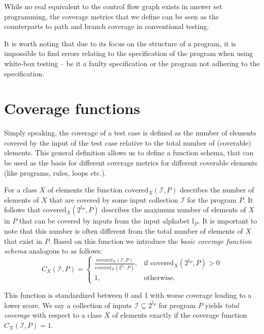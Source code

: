 While no real equivalent to the control flow graph exists in answer set programming, the coverage metrics that we define can be seen as the counterparts to path and branch coverage in conventional testing.

It is worth noting that due to its focus on the structure of a program, it is impossible to find errors relating to the specification of the program when using white-box testing -- be it a faulty specification or the program not adhering to the specification.


\section{Coverage functions}
\label{sec:Coverage metrics/Coverage functions}
Simply speaking, the coverage of a test case is defined as the number of elements covered by the input of the test case relative to the total number of (coverable) elements. This general definition allows us to define a function schema, that can be used as the basis for different coverage metrics for different coverable elements (like programs, rules, loops etc.). 

For a class $X$ of elements the function \(\text{covered}_X(\mathcal{I}, P)\) describes the number of elements of $X$ that are covered by some input collection $\mathcal{I}$ for the program $P$. It follows that \(\text{covered}_X(2^{\mathbb{I}_P}, P)\) describes the maximum number of elements of $X$ in $P$ that can be covered by inputs from the input alphabet \(\mathbb{I}_P\). It is important to note that this number is often different from the total number of elements of $X$ that exist in $P$. Based on this function we introduce the \emph{basic coverage function schema} analogous to \cite{Jan+10} as follows:
\begin{equation}
\label{eq:coverage function schema}
    C_X(\mathcal{I}, P) = 
    \begin{cases}
        \frac{\text{covered}_X(\mathcal{I}, P)}{\text{covered}_X(2^{\mathbb{I}_P}, P)}, & \text{if covered}_X(2^{\mathbb{I}_P}, P) > 0 \\
        1, & \text{otherwise.}
    \end{cases}
\end{equation}

This function is standardized between 0 and 1 with worse coverage leading to a lower score. We say a collection of inputs \(\mathcal{I} \subseteq 2^{\mathbb{I}_P}\) for program $P$ yields \emph{total coverage} with respect to a class $X$ of elements exactly if the coverage function $C_X(\mathcal{I}, P) = 1$.

